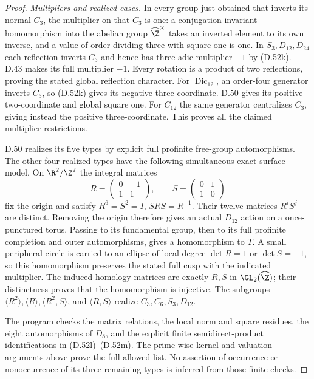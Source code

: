\begin{proof}
\emph{Multipliers and realized cases.}
In every group just obtained that inverts
its normal $C_3$, the multiplier on that
$C_3$ is one: a conjugation-invariant
homomorphism into the abelian group
$\widehat\Z^\times$ takes an inverted
element to its own inverse, and a value
of order dividing three with square one
is one.
In $S_3,D_{12},D_{24}$ each reflection
inverts $C_3$ and hence has three-adic
multiplier $-1$ by (D.52k).
D.43 makes its full multiplier $-1$.
Every rotation is a product of two
reflections, proving the stated global
reflection character.
For $\operatorname{Dic}_{12}$, an
order-four generator inverts $C_3$,
so (D.52k) gives its negative
three-coordinate. D.50 gives its positive
two-coordinate and global square one.
For $C_{12}$ the same generator centralizes
$C_3$, giving instead the positive
three-coordinate. This proves all the
claimed multiplier restrictions.

D.50 realizes its five types by explicit
full profinite free-group automorphisms.
The other four realized types have the
following simultaneous exact surface model.
On $\R^2/\Z^2$ the integral matrices
\[
       R=\begin{pmatrix}0&-1\\1&1\end{pmatrix},
       \qquad
       S=\begin{pmatrix}0&1\\1&0\end{pmatrix}            \tag{D.52n}
\]
fix the origin and satisfy
$R^6=S^2=I$, $SRS=R^{-1}$.
Their twelve matrices $R^iS^j$ are distinct.
Removing the origin therefore gives an
actual $D_{12}$ action on a once-punctured
torus. Passing to its fundamental group,
then to its full profinite completion and
outer automorphisms, gives a homomorphism
to $T$. A small peripheral circle is
carried to an ellipse of local degree
$\det R=1$ or $\det S=-1$, so this
homomorphism preserves the stated full
cusp with the indicated multiplier.
The induced homology matrices are exactly
$R,S$ in $\GL_2(\widehat\Z)$; their
distinctness proves that the homomorphism
is injective.
The subgroups
$\langle R^2\rangle,\langle R\rangle,
\langle R^2,S\rangle$, and
$\langle R,S\rangle$ realize
$C_3,C_6,S_3,D_{12}$.

The program
checks the matrix relations, the local
norm and square residues, the eight
automorphisms of $D_8$, and the explicit
finite semidirect-product identifications
in (D.52l)--(D.52m).
The prime-wise kernel and valuation
arguments above prove the full allowed
list. No assertion of occurrence or
nonoccurrence of its three remaining
types is inferred from those finite checks.
\end{proof}
